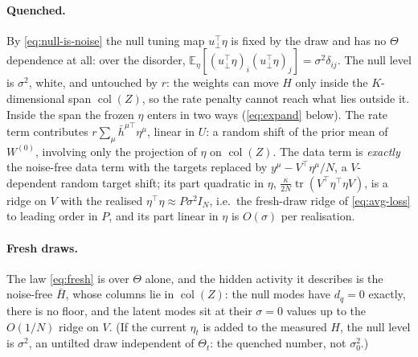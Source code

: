 \documentclass[11pt,a4paper]{article}
\newcommand{\E}{\mathbb E}
\newcommand{\tr}{\operatorname{tr}}
\newcommand{\col}{\operatorname{col}}
\newcommand{\hb}{\bar h}
\theoremstyle{remark}
\begin{document}
\paragraph{Quenched.}
By \eqref{eq:null-is-noise} the null tuning map $u_\perp^\top\eta$ is fixed by
the draw and has no $\Theta$ dependence at all: over the disorder,
$\E_\eta[(u_\perp^\top\eta)_i(u_\perp^\top\eta)_j] = \sigma^2\delta_{ij}$.
The null level is $\sigma^2$, white, and untouched by $r$: the weights can
move $H$ only inside the $K$-dimensional span $\col(Z)$, so the rate penalty
cannot reach what lies outside it. Inside the span the frozen $\eta$ enters
in two ways (\eqref{eq:expand} below). The rate term contributes
$r\sum_\mu\hb^{\mu\top}\eta^\mu$, linear in $U$: a random shift of the prior
mean of $W^{(0)}$, involving only the projection of $\eta$ on $\col(Z)$. The
data term is \emph{exactly} the noise-free data term with the targets
replaced by $y^\mu - V^\top\eta^\mu/N$, a $V$-dependent random target shift;
its part quadratic in $\eta$, $\frac{\kappa}{2N}\tr(V^\top\eta^\top\eta V)$, is
a ridge on $V$ with the realised $\eta^\top\eta\approx P\sigma^2I_N$, i.e.\
the fresh-draw ridge of \eqref{eq:avg-loss} to leading order in $P$, and its
part linear in $\eta$ is $O(\sigma)$ per realisation.

\paragraph{Fresh draws.}
The law \eqref{eq:fresh} is over $\Theta$ alone, and the hidden activity it
describes is the noise-free $\bar H$, whose columns lie in $\col(Z)$: the
null modes have $d_q = 0$ exactly, there is no floor, and the latent modes
sit at their $\sigma = 0$ values up to the $O(1/N)$ ridge on $V$. (If the
current $\eta_t$ is added to the measured $H$, the null level is $\sigma^2$,
an untilted draw independent of $\Theta_t$: the quenched number, not
$\sigma_0^2$.)
\end{document}

